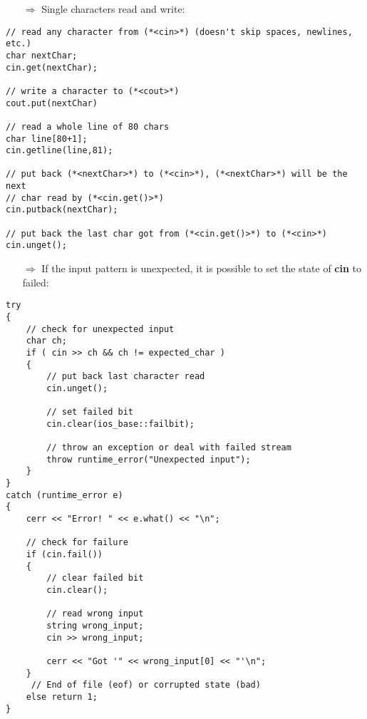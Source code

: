 \documentclass[10pt]{article}
\begin{document}
\begin{enumerate}
\item[$\Rightarrow$] Single characters read and write:
\end{enumerate}
\begin{lstlisting}
// read any character from (*<cin>*) (doesn't skip spaces, newlines, etc.)
char nextChar;
cin.get(nextChar);

// write a character to (*<cout>*)
cout.put(nextChar)

// read a whole line of 80 chars
char line[80+1];
cin.getline(line,81);

// put back (*<nextChar>*) to (*<cin>*), (*<nextChar>*) will be the next 
// char read by (*<cin.get()>*)
cin.putback(nextChar);

// put back the last char got from (*<cin.get()>*) to (*<cin>*)
cin.unget();
\end{lstlisting}
\begin{enumerate}
\item[$\Rightarrow$] If the input pattern is unexpected, it is possible to set the state of \textbf{cin} to failed:
\end{enumerate}
\begin{lstlisting}
try
{
    // check for unexpected input
    char ch;
    if ( cin >> ch && ch != expected_char )
    {
        // put back last character read
        cin.unget();
        
        // set failed bit
        cin.clear(ios_base::failbit);
    
        // throw an exception or deal with failed stream
        throw runtime_error("Unexpected input");
    }
}
catch (runtime_error e)
{
    cerr << "Error! " << e.what() << "\n";
            
    // check for failure
    if (cin.fail())
    {
        // clear failed bit
        cin.clear();
                
        // read wrong input
        string wrong_input;
        cin >> wrong_input;
                    
        cerr << "Got '" << wrong_input[0] << "'\n";
    }
     // End of file (eof) or corrupted state (bad)
    else return 1;
}
\end{lstlisting}
%
%
\end{document}
